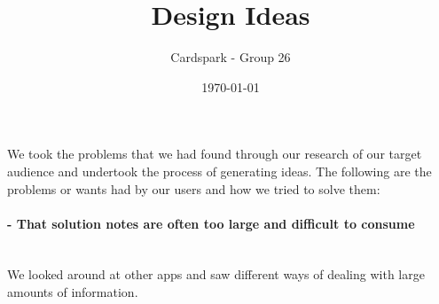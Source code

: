 \documentclass{article}
\begin{document}
\title{Design Ideas}
\author{Cardspark - Group 26}
\date{\today}
\maketitle

We took the problems that we had found through our research of our target audience and undertook the process of generating ideas.
The following are the problems or wants had by our users and how we tried to solve them:
\vspace{-2mm}

\paragraph{\textbf{- That solution notes are often too large and difficult to consume}}
	\mbox{}\\
	We looked around at other apps and saw different ways of dealing with large amounts of information.
\end{document}
